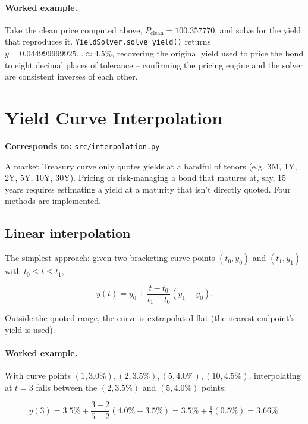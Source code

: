\documentclass[11pt]{article}
\begin{document}
\paragraph{Worked example.} Take the clean price computed above, $P_{\text{clean}} =
100.357770$, and solve for the yield that reproduces it. \texttt{YieldSolver.solve\_yield()}
returns $y = 0.044999999925\ldots \approx 4.5\%$, recovering the original yield used to price
the bond to eight decimal places of tolerance -- confirming the pricing engine and the solver
are consistent inverses of each other.

\section{Yield Curve Interpolation}
\label{sec:interpolation}

\textbf{Corresponds to:} \texttt{src/interpolation.py}.

A market Treasury curve only quotes yields at a handful of tenors (e.g. 3M, 1Y, 2Y, 5Y, 10Y,
30Y). Pricing or risk-managing a bond that matures at, say, 15 years requires estimating a
yield at a maturity that isn't directly quoted. Four methods are implemented.

\subsection{Linear interpolation}

The simplest approach: given two bracketing curve points $(t_0, y_0)$ and $(t_1, y_1)$ with
$t_0 \le t \le t_1$,

\begin{equation}
  y(t) = y_0 + \frac{t - t_0}{t_1 - t_0}(y_1 - y_0).
\end{equation}

Outside the quoted range, the curve is extrapolated flat (the nearest endpoint's yield is
used).

\paragraph{Worked example.} With curve points $(1, 3.0\%), (2, 3.5\%), (5, 4.0\%), (10,
4.5\%)$, interpolating at $t=3$ falls between the $(2, 3.5\%)$ and $(5, 4.0\%)$ points:

\[
  y(3) = 3.5\% + \frac{3-2}{5-2}(4.0\% - 3.5\%) = 3.5\% + \tfrac{1}{3}(0.5\%) = 3.6\overline{6}\%.
\]
\end{document}
